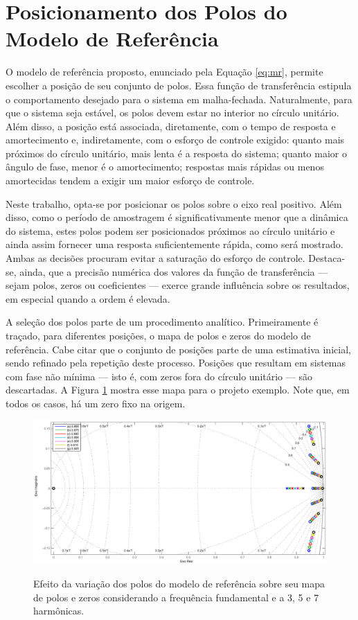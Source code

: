 \documentclass[repeatfields,oneside,overleaf]{tcc}
\begin{document}
\section{Posicionamento dos Polos do Modelo de Referência}

O modelo de referência proposto, enunciado pela Equação \eqref{eq:mr}, permite escolher a posição de seu conjunto de polos.
Essa função de transferência estipula o comportamento desejado para o sistema em malha-fechada.
Naturalmente, para que o sistema seja estável, os polos devem estar no interior no círculo unitário.
Além disso, a posição está associada, diretamente, com o tempo de resposta e amortecimento e, indiretamente, com o esforço de controle exigido:
quanto mais próximos do círculo unitário, mais lenta é a resposta do sistema;
quanto maior o ângulo de fase, menor é o amortecimento;
respostas mais rápidas ou menos amortecidas tendem a exigir um maior esforço de controle.

Neste trabalho, opta-se por posicionar os polos sobre o eixo real positivo.
Além disso, como o período de amostragem é significativamente menor que a dinâmica do sistema, estes polos podem ser posicionados próximos ao círculo unitário e ainda assim fornecer uma resposta suficientemente rápida, como será mostrado.
Ambas as decisões procuram evitar a saturação do esforço de controle.
Destaca-se, ainda, que a precisão numérica dos valores da função de transferência --- sejam polos, zeros ou coeficientes --- exerce grande influência sobre os resultados, em especial quando a ordem é elevada.

A seleção dos polos parte de um procedimento analítico.
Primeiramente é traçado, para diferentes posições, o mapa de polos e zeros do modelo de referência.
Cabe citar que o conjunto de posições parte de uma estimativa inicial, sendo refinado pela repetição deste processo.
Posições que resultam em sistemas com fase não mínima --- isto é, com zeros fora do círculo unitário --- são descartadas.
A Figura \ref{fig:pz_M_7} mostra esse mapa para o projeto exemplo.
Note que, em todos os casos, há um zero fixo na origem.

\begin{figure}[h]
    \centering
    \caption{Efeito da variação dos polos do modelo de referência sobre seu mapa de polos e zeros considerando a frequência fundamental e a 3{\textordfeminine}, 5{\textordfeminine} e 7{\textordfeminine} harmônicas.}
    \includegraphics[trim={80 25 80 43}, clip, width=0.78\linewidth]{fig/pz_M_7.eps}
    \\
    \label{fig:pz_M_7}
\end{figure}
\end{document}
